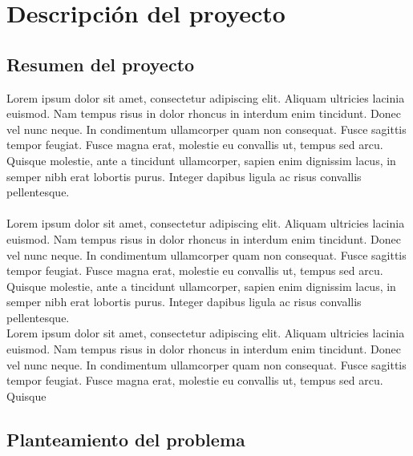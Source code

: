 
\chapter{Descripción del proyecto} %

\label{Chapter1} %


\section{Resumen del proyecto}
Lorem ipsum dolor sit amet, consectetur adipiscing elit. Aliquam ultricies lacinia euismod. Nam tempus risus in dolor rhoncus in interdum enim tincidunt. Donec vel nunc neque. In condimentum ullamcorper quam non consequat. Fusce sagittis tempor feugiat. Fusce magna erat, molestie eu convallis ut, tempus sed arcu. Quisque molestie, ante a tincidunt ullamcorper, sapien enim dignissim lacus, in semper nibh erat lobortis purus. Integer dapibus ligula ac risus convallis pellentesque.
\\
\\
Lorem ipsum dolor sit amet, consectetur adipiscing elit. Aliquam ultricies lacinia euismod. Nam tempus risus in dolor rhoncus in interdum enim tincidunt. Donec vel nunc neque. In condimentum ullamcorper quam non consequat. Fusce sagittis tempor feugiat. Fusce magna erat, molestie eu convallis ut, tempus sed arcu. Quisque molestie, ante a tincidunt ullamcorper, sapien enim dignissim lacus, in semper nibh erat lobortis purus. Integer dapibus ligula ac risus convallis pellentesque.
\\
Lorem ipsum dolor sit amet, consectetur adipiscing elit. Aliquam ultricies lacinia euismod. Nam tempus risus in dolor rhoncus in interdum enim tincidunt. Donec vel nunc neque. In condimentum ullamcorper quam non consequat. Fusce sagittis tempor feugiat. Fusce magna erat, molestie eu convallis ut, tempus sed arcu. Quisque
\section{Planteamiento del problema}


